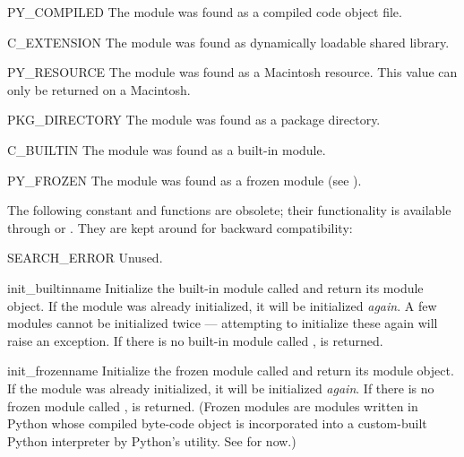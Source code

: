 \begin{datadesc}{PY_COMPILED}
The module was found as a compiled code object file.
\end{datadesc}

\begin{datadesc}{C_EXTENSION}
The module was found as dynamically loadable shared library.
\end{datadesc}

\begin{datadesc}{PY_RESOURCE}
The module was found as a Macintosh resource.  This value can only be
returned on a Macintosh.
\end{datadesc}

\begin{datadesc}{PKG_DIRECTORY}
The module was found as a package directory.
\end{datadesc}

\begin{datadesc}{C_BUILTIN}
The module was found as a built-in module.
\end{datadesc}

\begin{datadesc}{PY_FROZEN}
The module was found as a frozen module (see ).
\end{datadesc}

The following constant and functions are obsolete; their functionality
is available through  or .
They are kept around for backward compatibility:

\begin{datadesc}{SEARCH_ERROR}
Unused.
\end{datadesc}

\begin{funcdesc}{init_builtin}{name}
Initialize the built-in module called  and return its module
object.  If the module was already initialized, it will be initialized
\emph{again}.  A few modules cannot be initialized twice --- attempting
to initialize these again will raise an 
exception.  If there is no
built-in module called ,  is returned.
\end{funcdesc}

\begin{funcdesc}{init_frozen}{name}
Initialize the frozen module called  and return its module
object.  If the module was already initialized, it will be initialized
\emph{again}.  If there is no frozen module called ,
 is returned.  (Frozen modules are modules written in
Python whose compiled byte-code object is incorporated into a
custom-built Python interpreter by Python's  utility.
See  for now.)
\end{funcdesc}

